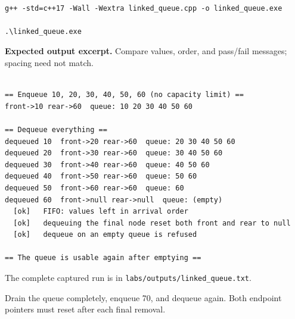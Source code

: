 \begin{lstlisting}[style=utpterminal,language={}]

g++ -std=c++17 -Wall -Wextra linked_queue.cpp -o linked_queue.exe

.\linked_queue.exe

\end{lstlisting}

\textbf{Expected output excerpt.} Compare values, order, and pass/fail messages; spacing need not match.

\begin{lstlisting}[style=utpterminal,language={}]

== Enqueue 10, 20, 30, 40, 50, 60 (no capacity limit) ==
front->10 rear->60  queue: 10 20 30 40 50 60 

== Dequeue everything ==
dequeued 10  front->20 rear->60  queue: 20 30 40 50 60 
dequeued 20  front->30 rear->60  queue: 30 40 50 60 
dequeued 30  front->40 rear->60  queue: 40 50 60 
dequeued 40  front->50 rear->60  queue: 50 60 
dequeued 50  front->60 rear->60  queue: 60 
dequeued 60  front->null rear->null  queue: (empty)
  [ok]   FIFO: values left in arrival order
  [ok]   dequeuing the final node reset both front and rear to null
  [ok]   dequeue on an empty queue is refused

== The queue is usable again after emptying ==

\end{lstlisting}

The complete captured run is in \texttt{labs/outputs/linked\_queue.txt}.

\begin{tryit}

Drain the queue completely, enqueue 70, and dequeue again. Both endpoint pointers must reset after each final removal.

\end{tryit}
